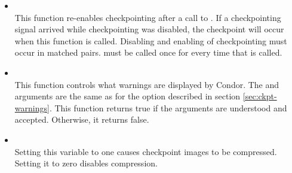 \begin{itemize}
\item {}\\
This function re-enables checkpointing after a call to
.  If a checkpointing signal arrived
while checkpointing was disabled, the checkpoint will occur when
this function is called.  Disabling and enabling of checkpointing
must occur in matched pairs.   must
be called once for every time that 
is called.

\item {}\\
This function controls what warnings are displayed by Condor.
The  and  arguments are the same as for the
 option described in section \ref{sec:ckpt-warnings}.  This function returns true
if the arguments are understood and accepted.  Otherwise, it returns false.

\item {}\\
Setting this variable to one causes checkpoint images to be compressed.
Setting it to zero disables compression.

\end{itemize}

